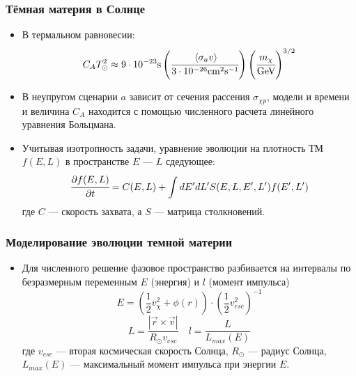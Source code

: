 \documentclass[
11pt,]{beamer}
\newcommand{\cderiv}[2]{\cfrac{\partial #1}{\partial #2}}
\newcommand{\avarage}[1]{\left\langle #1 \right\rangle}
\begin{document}
	\begin{frame}
		\frametitle{Тёмная материя в Солнце}
		\begin{itemize}
	\item В термальном равновесии:
	\begin{equation*}
		C_A T_{\odot}^2 \approx
		9\cdot10^{-23} \text{s}	\left(\cfrac{   \avarage{\sigma_{a}v}    }{3\cdot10^{-26} \text{cm}^2\text{s}^{-1}} \right)
		\left(\cfrac{m_{\chi}}{\text{GeV}}\right)^{3/2}
	\end{equation*}
	\item В неупругом сценарии $a$ зависит от сечения рассения $\sigma_{\chi p}$, модели и времени и величина $C_A$ находится с помощью численного расчета линейного уравнения Больцмана.
	\item Учитывая изотропность задачи, уравнение эволюции на плотность ТМ $f(E,L)$ в пространстве $E$ --- $L$ сдедующее:
	\begin{equation*}
			\cderiv{f(E,L)}{t} = C(E,L)
			+ \int{dE'dL' S(E,L,E',L') f(E',L')}
	\end{equation*}
	где $C$ --- скорость захвата, а $S$ --- матрица столкновений.
\end{itemize}




	\end{frame}

	\begin{frame}
	\frametitle{Моделирование эволюции темной материи}
	\begin{itemize}
	\item Для численного решение фазовое пространство разбивается на интервалы по безразмерным переменным $E$ (энергия) и $l$ (момент импульса)
	\begin{equation*}
			E = \left(\frac{1}{2} v_{\chi}^2 + \phi(r)\right)\cdot
			\left(\frac{1}{2} v_{esc}^2 \right)^{-1} 
	\end{equation*}		
	\begin{equation*}
			L = \frac{|\vec{r} \times \vec{v}|}
			{R_{\odot} v_{esc}} \quad l = \frac{L}{L_{max}(E)}
	\end{equation*}
	где $v_{esc}$ --- вторая космическая скорость Солнца, $R_{\odot}$ --- радиус Солнца, $L_{max}(E)$ --- максимальный момент импульса при энергии $E$.
\end{itemize}
	\end{frame}
	
\end{document}
